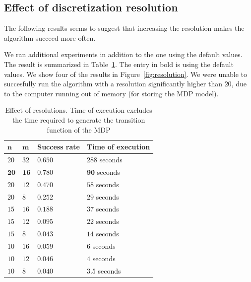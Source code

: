 \documentclass[10pt,a4paper,oneside]{article}
\begin{document}
\subsection{Effect of discretization resolution}
The following results seems to suggest that increasing the resolution makes the algorithm
succeed more often.

We ran additional experiments in addition to the one using the default
values. The result is summarized in Table~\ref{table:resolution}.
The entry in bold is using the default values.
We show four of the results in Figure~\ref{fig:resolution}.
We were unable to succesfully run the algorithm with a resolution significantly higher than
$20$, due to the computer running out of memory (for storing the MDP model).

\begin{table}
\begin{center}
\begin{tabular}{| l | l | l | l | }
\hline
  $\mathbf{n}$ & $\mathbf{m}$ & \textbf{Success rate} & \textbf{Time of execution} \\ \hline \hline
  $20$ & $32$ & $0.650 $ & $288$ seconds \\ \hline  %
  $\mathbf{20}$ & $\mathbf{16}$ & $\mathbf{0.780}$ & $\mathbf{90}$ seconds \\ \hline
  $20$ & $12$ & $0.470$ & $58$ seconds \\ \hline
  $20$ & $8$ & $0.252$ & $29$ seconds \\ \hline  %

  $15$ & $16$ & $0.188$ & $37$ seconds \\ \hline
  $15$ & $12$ & $0.095$ & $22$ seconds \\ \hline
  $15$ & $8$ & $0.043$ & $14$ seconds \\ \hline

  $10$ & $16$ & $0.059$ & $6$ seconds \\ \hline %
  $10$ & $12$ & $0.046$ & $4$ seconds \\ \hline
  $10$ & $8$ & $0.040$ & $3.5$ seconds \\ \hline %
\end{tabular}
\end{center}
\caption{Effect of resolutions. Time of execution excludes the time required
         to generate the transition function of the MDP}
\label{table:resolution}
\end{table}
\end{document}
